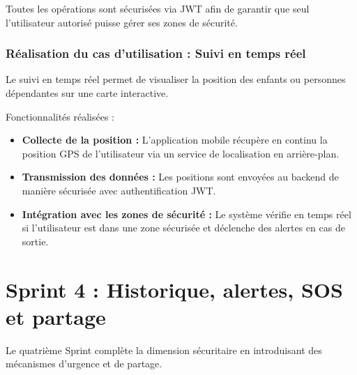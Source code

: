 Toutes les opérations sont sécurisées via JWT afin de garantir que seul l’utilisateur autorisé puisse gérer ses zones de sécurité.

\subsubsection{Réalisation du cas d'utilisation : Suivi en temps réel}

Le suivi en temps réel permet de visualiser la position des enfants ou personnes dépendantes sur une carte interactive.

Fonctionnalités réalisées :

\begin{itemize}
 \item \textbf{Collecte de la position :} L’application mobile récupère en continu la position GPS de l’utilisateur via un service de localisation en arrière-plan.

 \item \textbf{Transmission des données :} Les positions sont envoyées au backend de manière sécurisée avec authentification JWT.


 \item \textbf{Intégration avec les zones de sécurité :} Le système vérifie en temps réel si l’utilisateur est dans une zone sécurisée et déclenche des alertes en cas de sortie.
\end{itemize}

\section{Sprint 4 : Historique, alertes, SOS et partage}

Le quatrième Sprint complète la dimension sécuritaire en introduisant des mécanismes d'urgence et de partage.

